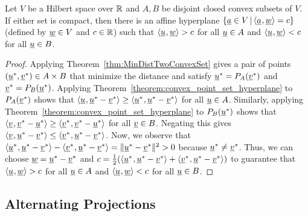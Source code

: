 \begin{theorem}
Let $V$ be a Hilbert space over $\mathbb{R}$ and $A,B$ be disjoint closed convex subsets of $V$.
If either set is compact, then there is an affine hyperplane $\{ \underline{a} \in V \,|\, {\langle  \underline{a}  \mskip1mu ,  \underline{w}  \rangle} = c \}$ (defined by $\underline{w} \in V$ and $c\in \mathbb{R}$) such that ${\langle  \underline{u}  \mskip1mu ,  \underline{w}  \rangle} > c$ for all $\underline{u} \in A$ and ${\langle  \underline{u}  \mskip1mu ,  \underline{w}  \rangle} < c$ for all $\underline{u} \in B$.
\end{theorem}
\begin{proof}
Applying Theorem~\ref{thm:MinDistTwoConvexSet} gives a pair of points $(\underline{u}^*,\underline{v}^*) \in A \times B$ that minimize the distance and satisfy $\underline{u}^* = P_A (\underline{v}^*)$ and $\underline{v}^* = P_B (\underline{u}^*)$.
Applying Theorem~\ref{theorem:convex_point_set_hyperplane} to $P_A (\underline{v}^*)$ shows that ${\langle  \underline{u}  \mskip1mu ,  \underline{u}^* - \underline{v}^*  \rangle} \geq {\langle  \underline{u}^*  \mskip1mu ,  \underline{u}^* - \underline{v}^*  \rangle}$ for all $\underline{u} \in A$.
Similarly, applying Theorem~\ref{theorem:convex_point_set_hyperplane} to $P_B (\underline{u}^*)$ shows that ${\langle  \underline{v}  \mskip1mu ,  \underline{v}^* - \underline{u}^*  \rangle} \geq {\langle  \underline{v}^*  \mskip1mu ,  \underline{v}^* - \underline{u}^*  \rangle}$ for all $\underline{v} \in B$.
Negating this gives ${\langle  \underline{v}  \mskip1mu ,  \underline{u}^* - \underline{v}^*  \rangle} \leq {\langle  \underline{v}^*  \mskip1mu ,  \underline{u}^* - \underline{v}^*  \rangle}$.
Now, we observe that  ${\langle  \underline{u}^*  \mskip1mu ,  \underline{u}^* - \underline{v}^*  \rangle} - {\langle  \underline{v}^*  \mskip1mu ,  \underline{u}^* - \underline{v}^*  \rangle} = \| \underline{u}^* - \underline{v}^* \|^2 > 0$ because $\underline{u}^* \neq \underline{v}^*$.
Thus, we can choose $\underline{w} = \underline{u}^* - \underline{v}^*$ and $c=\frac{1}{2}({\langle  \underline{u}^*  \mskip1mu ,  \underline{u}^* - \underline{v}^*  \rangle} + {\langle  \underline{v}^*  \mskip1mu ,  \underline{u}^* - \underline{v}^*  \rangle})$  to guarantee that ${\langle  \underline{u}  \mskip1mu ,  \underline{w}  \rangle} > c$ for all $\underline{u} \in A$ and ${\langle  \underline{u}  \mskip1mu ,  \underline{w}  \rangle} < c$ for all $\underline{u} \in B$.
\end{proof}

\iffalse
\subsection{Alternating Projections}

